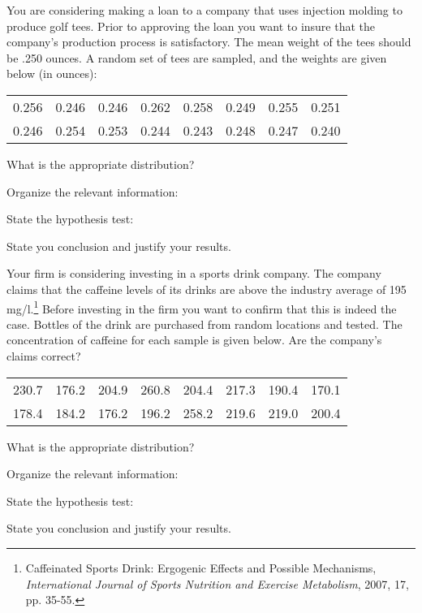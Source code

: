 \begin{problem}
\item You are considering making a loan to a company that uses
  injection molding to produce golf tees. Prior to approving the loan
  you want to insure that the company's production process is
  satisfactory. The mean weight of the tees should be .250 ounces. A
  random set of tees are sampled, and the weights are given below (in ounces): \\
  \begin{tabular}{rrrrrrrr}
    0.256 & 0.246 & 0.246 & 0.262 & 0.258 & 0.249 & 0.255 & 0.251 \\
    0.246 & 0.254 & 0.253 & 0.244 & 0.243 & 0.248 & 0.247 & 0.240
  \end{tabular}

  \begin{subproblem}
  \item What is the appropriate distribution? 
  \item Organize the relevant information: \\ [30pt]
  \item State the hypothesis test: \\ [20pt]
  \item State you conclusion and justify your results.

    \vfill
  \end{subproblem}


    \vfill
    \clearpage

\item Your firm is considering investing in a sports drink
  company. The company claims that the caffeine levels of its drinks
  are above the industry average of 195 mg/l.\footnote{Caffeinated
    Sports Drink: Ergogenic Effects and Possible Mechanisms,
    \textit{International Journal of Sports Nutrition and Exercise
      Metabolism}, 2007, 17, pp. 35-55.} Before investing in the firm
  you want to confirm that this is indeed the case. Bottles of the
  drink are purchased from random locations and tested. The
  concentration of caffeine for each sample is given below. Are the
  company's claims correct? \\
  \begin{tabular}{rrrrrrrr}
    230.7 & 176.2 & 204.9 & 260.8 & 204.4 & 217.3 & 190.4 & 170.1 \\
    178.4 & 184.2 & 176.2 & 196.2 & 258.2 & 219.6 & 219.0 & 200.4
  \end{tabular}


  \begin{subproblem}
  \item What is the appropriate distribution? 
  \item Organize the relevant information: \\ [30pt]
  \item State the hypothesis test: \\ [20pt]
  \item State you conclusion and justify your results.

    \vfill
  \end{subproblem}

  \clearpage

\end{problem}
